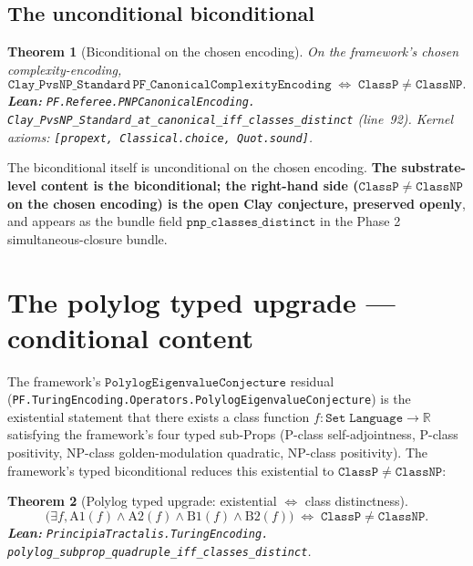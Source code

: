 \documentclass[11pt,a4paper]{article}
\theoremstyle{plain}
\newtheorem{theorem}{Theorem}[section]
\theoremstyle{definition}
\begin{document}
\subsection{The unconditional biconditional}
\label{sec:biconditional}

\begin{theorem}[Biconditional on the chosen encoding]
\label{thm:canonical-iff-distinct}
On the framework's chosen complexity-encoding,
\[
\mathtt{Clay\_PvsNP\_Standard}\,
\mathtt{PF\_CanonicalComplexityEncoding}
\;\Longleftrightarrow\;
\mathtt{ClassP} \neq \mathtt{ClassNP}.
\]
\textbf{Lean:}
\texttt{PF.Referee.PNPCanonicalEncoding.\\
Clay\_PvsNP\_Standard\_at\_canonical\_iff\_classes\_distinct}
(line~92). Kernel axioms:
\texttt{[propext, Classical.choice, Quot.sound]}.
\end{theorem}

\noindent The biconditional itself is unconditional on the chosen
encoding. \textbf{The substrate-level content is the biconditional;
the right-hand side ($\mathtt{ClassP} \neq \mathtt{ClassNP}$ on the
chosen encoding) is the open Clay conjecture, preserved openly}, and
appears as the bundle field $\mathtt{pnp\_classes\_distinct}$ in the
Phase 2 simultaneous-closure bundle.

\section{The polylog typed upgrade --- conditional content}
\label{sec:polylog-typed}

The framework's $\mathtt{PolylogEigenvalueConjecture}$ residual
(\texttt{PF.TuringEncoding.Operators.PolylogEigenvalueConjecture})
is the existential statement that there exists a class function
$f : \mathtt{Set\;Language} \to \mathbb{R}$ satisfying the
framework's four typed sub-Props (P-class self-adjointness, P-class
positivity, NP-class golden-modulation quadratic, NP-class
positivity). The framework's typed biconditional reduces this
existential to $\mathtt{ClassP} \neq \mathtt{ClassNP}$:

\begin{theorem}[Polylog typed upgrade: existential $\Leftrightarrow$
class distinctness]
\label{thm:polylog-typed-upgrade}
\[
\bigl(\exists f, \mathrm{A1}(f) \wedge \mathrm{A2}(f) \wedge
\mathrm{B1}(f) \wedge \mathrm{B2}(f)\bigr)
\;\Longleftrightarrow\;
\mathtt{ClassP} \neq \mathtt{ClassNP}.
\]
\textbf{Lean:}
\texttt{PrincipiaTractalis.TuringEncoding.\\
polylog\_subprop\_quadruple\_iff\_classes\_distinct}.
\end{theorem}
\end{document}
